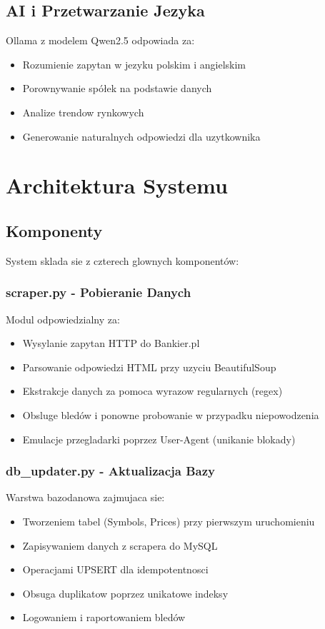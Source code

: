 \documentclass[11pt,a4paper]{article}
\begin{document}
\subsection{AI i Przetwarzanie Jezyka}

Ollama z modelem Qwen2.5 odpowiada za:
\begin{itemize}
    \item Rozumienie zapytan w jezyku polskim i angielskim
    \item Porownywanie spółek na podstawie danych
    \item Analize trendow rynkowych
    \item Generowanie naturalnych odpowiedzi dla uzytkownika
\end{itemize}

\section{Architektura Systemu}

\subsection{Komponenty}

System sklada sie z czterech glownych komponentów:

\subsubsection{scraper.py - Pobieranie Danych}

Modul odpowiedzialny za:
\begin{itemize}
    \item Wysylanie zapytan HTTP do Bankier.pl
    \item Parsowanie odpowiedzi HTML przy uzyciu BeautifulSoup
    \item Ekstrakcje danych za pomoca wyrazow regularnych (regex)
    \item Obsluge bledów i ponowne probowanie w przypadku niepowodzenia
    \item Emulacje przegladarki poprzez User-Agent (unikanie blokady)
\end{itemize}

\subsubsection{db\_updater.py - Aktualizacja Bazy}

Warstwa bazodanowa zajmujaca sie:
\begin{itemize}
    \item Tworzeniem tabel (Symbols, Prices) przy pierwszym uruchomieniu
    \item Zapisywaniem danych z scrapera do MySQL
    \item Operacjami UPSERT dla idempotentnosci
    \item Obsuga duplikatow poprzez unikatowe indeksy
    \item Logowaniem i raportowaniem bledów
\end{itemize}
\end{document}
